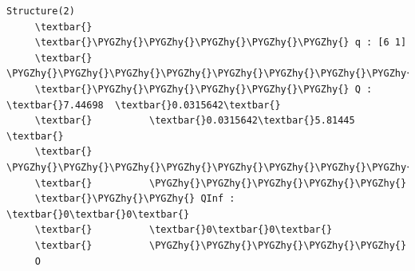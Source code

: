 \documentclass[letterpaper,10pt,english]{sphinxmanual}
\def\PYGZhy{\char`\-}
\begin{document}
\begin{Verbatim}[commandchars=\\\{\}]
  Structure(2)
     \textbar{}
     \textbar{}\PYGZhy{}\PYGZhy{}\PYGZhy{}\PYGZhy{}\PYGZhy{} q : [6 1]
     \textbar{}          \PYGZhy{}\PYGZhy{}\PYGZhy{}\PYGZhy{}\PYGZhy{}\PYGZhy{}\PYGZhy{}\PYGZhy{}\PYGZhy{}\PYGZhy{}\PYGZhy{}\PYGZhy{}\PYGZhy{}\PYGZhy{}\PYGZhy{}\PYGZhy{}\PYGZhy{}\PYGZhy{}\PYGZhy{}\PYGZhy{}\PYGZhy{}
     \textbar{}\PYGZhy{}\PYGZhy{}\PYGZhy{}\PYGZhy{}\PYGZhy{} Q : \textbar{}7.44698  \textbar{}0.0315642\textbar{}
     \textbar{}          \textbar{}0.0315642\textbar{}5.81445  \textbar{}
     \textbar{}          \PYGZhy{}\PYGZhy{}\PYGZhy{}\PYGZhy{}\PYGZhy{}\PYGZhy{}\PYGZhy{}\PYGZhy{}\PYGZhy{}\PYGZhy{}\PYGZhy{}\PYGZhy{}\PYGZhy{}\PYGZhy{}\PYGZhy{}\PYGZhy{}\PYGZhy{}\PYGZhy{}\PYGZhy{}\PYGZhy{}\PYGZhy{}
     \textbar{}          \PYGZhy{}\PYGZhy{}\PYGZhy{}\PYGZhy{}\PYGZhy{}
     \textbar{}\PYGZhy{}\PYGZhy{} QInf : \textbar{}0\textbar{}0\textbar{}
     \textbar{}          \textbar{}0\textbar{}0\textbar{}
     \textbar{}          \PYGZhy{}\PYGZhy{}\PYGZhy{}\PYGZhy{}\PYGZhy{}
     O
\end{Verbatim}
\end{document}
